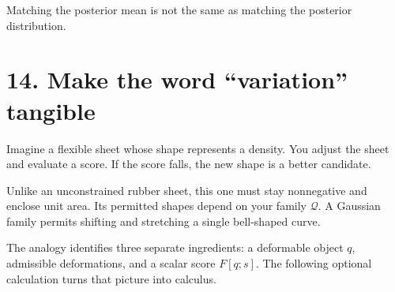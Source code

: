 \documentclass[
  letterpaper,
  DIV=11,
  numbers=noendperiod]{scrreprt}
\begin{document}
Matching the posterior mean is not the same as matching the posterior
distribution.

\section{14. Make the word ``variation''
tangible}\label{make-the-word-variation-tangible}

Imagine a flexible sheet whose shape represents a density. You adjust
the sheet and evaluate a score. If the score falls, the new shape is a
better candidate.

Unlike an unconstrained rubber sheet, this one must stay nonnegative and
enclose unit area. Its permitted shapes depend on your family
\(\mathcal Q\). A Gaussian family permits shifting and stretching a
single bell-shaped curve.

The analogy identifies three separate ingredients: a deformable object
\(q\), admissible deformations, and a scalar score \(F[q;s]\). The
following optional calculation turns that picture into calculus.
\end{document}
